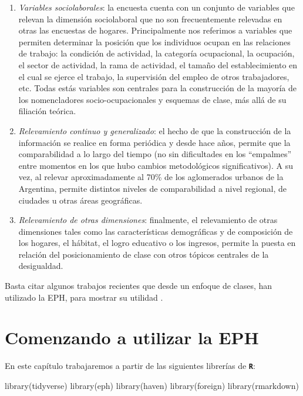 \documentclass[
]{book}
\newenvironment{Shaded}{\begin{snugshade}}{\end{snugshade}}
\newcommand{\FunctionTok}[1]{\textcolor[rgb]{0.00,0.00,0.00}{#1}}
\newcommand{\NormalTok}[1]{#1}
\begin{document}
\begin{enumerate}
\def\labelenumi{\arabic{enumi}.}
\item
  \emph{Variables sociolaborales}: la encuesta cuenta con un conjunto de variables que relevan la dimensión sociolaboral que no son frecuentemente relevadas en otras las encuestas de hogares. Principalmente nos referimos a variables que permiten determinar la posición que los individuos ocupan en las relaciones de trabajo: la condición de actividad, la categoría ocupacional, la ocupación, el sector de actividad, la rama de actividad, el tamaño del establecimiento en el cual se ejerce el trabajo, la supervisión del empleo de otros trabajadores, etc. Todas estás variables son centrales para la construcción de la mayoría de los nomencladores socio-ocupacionales y esquemas de clase, más allá de su filiación teórica.
\item
  \emph{Relevamiento continuo y generalizado}: el hecho de que la construcción de la información se realice en forma periódica y desde hace años, permite que la comparabilidad a lo largo del tiempo (no sin dificultades en los ``empalmes'' entre momentos en los que hubo cambios metodológicos significativos). A su vez, al relevar aproximadamente al 70\% de los aglomerados urbanos de la Argentina, permite distintos niveles de comparabilidad a nivel regional, de ciudades u otras áreas geográficas.
\item
  \emph{Relevamiento de otras dimensiones}: finalmente, el relevamiento de otras dimensiones tales como las características demográficas y de composición de los hogares, el hábitat, el logro educativo o los ingresos, permite la puesta en relación del posicionamiento de clase con otros tópicos centrales de la desigualdad.
\end{enumerate}

Basta citar algunos trabajos recientes que desde un enfoque de clases, han utilizado la EPH, para mostrar su utilidad \citep{Benza2016, ChavezMolina2015, Dalle.Stiberman2017, Palomino.Dalle2012, Pla.etal2018, Sacco2019, Solis.etal2019}.

\hypertarget{eph2}{%
\section{Comenzando a utilizar la EPH}\label{eph2}}

En este capítulo trabajaremos a partir de las siguientes librerías de \textbf{\texttt{R}}:

\begin{Shaded}
\begin{Highlighting}[]
\FunctionTok{library}\NormalTok{(tidyverse)}
\FunctionTok{library}\NormalTok{(eph)}
\FunctionTok{library}\NormalTok{(haven)}
\FunctionTok{library}\NormalTok{(foreign)}
\FunctionTok{library}\NormalTok{(rmarkdown)}
\end{Highlighting}
\end{Shaded}
\end{document}
